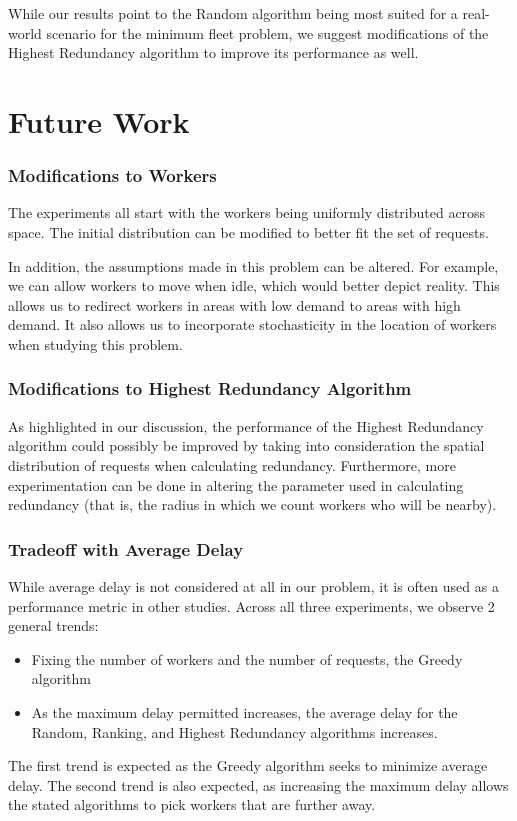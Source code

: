 \documentclass[urop]{socreport}
\begin{document}
While our results point to the Random algorithm being most suited for a real-world scenario for the minimum fleet problem, we suggest modifications of the Highest Redundancy algorithm to improve its performance as well. 

\section{Future Work}

\subsubsection{Modifications to Workers}
The experiments all start with the workers being uniformly distributed across space. The initial distribution can be modified to better fit the set of requests.

In addition, the assumptions made in this problem can be altered. For example, we can allow workers to move when idle, which would better depict reality. This allows us to redirect workers in areas with low demand to areas with high demand. It also allows us to incorporate stochasticity in the location of workers when studying this problem.

\subsubsection{Modifications to Highest Redundancy Algorithm}
As highlighted in our discussion, the performance of the Highest Redundancy algorithm could possibly be improved by taking into consideration the spatial distribution of requests when calculating redundancy. Furthermore, more experimentation can be done in altering the parameter used in calculating redundancy (that is, the radius in which we count workers who will be nearby).

\subsubsection{Tradeoff with Average Delay}
While average delay is not considered at all in our problem, it is often used as a performance metric in other studies. Across all three experiments, we observe 2 general trends:
\begin{itemize}
    \item Fixing the number of workers and the number of requests, the Greedy algorithm
    \item As the maximum delay permitted increases, the average delay for the Random, Ranking, and Highest Redundancy algorithms increases. 
\end{itemize}
The first trend is expected as the Greedy algorithm seeks to minimize average delay. The second trend is also expected, as increasing the maximum delay allows the stated algorithms to pick workers that are further away.
\end{document}
